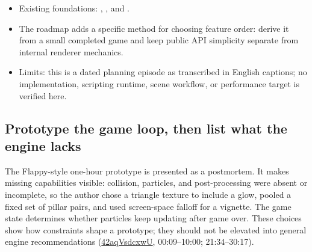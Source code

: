 \hypertarget{05-engine-i-ch013-source-to-volume-map}{}

\begin{itemize}
\tightlist
\item
  Existing foundations: , , and .
\item
  The roadmap adds a specific method for choosing feature order: derive it from a small completed game and keep public API simplicity separate from internal renderer mechanics.
\item
  Limits: this is a dated planning episode as transcribed in English captions; no implementation, scripting runtime, scene workflow, or performance target is verified here.
\end{itemize}

\subsection{Prototype the game loop, then list what the engine lacks}\label{05-engine-i-ch013-prototype-the-game-loop-then-list-what-the-engine-lacks}

\hypertarget{05-engine-i-ch013-prototype-the-game-loop-then-list-what-the-engine-lacks}{}

The Flappy-style one-hour prototype is presented as a postmortem. It makes missing capabilities visible: collision, particles, and post-processing were absent or incomplete, so the author chose a triangle texture to include a glow, pooled a fixed set of pillar pairs, and used screen-space falloff for a vignette. The game state determines whether particles keep updating after game over. These choices show how constraints shape a prototype; they should not be elevated into general engine recommendations (\href{https://www.youtube.com/watch?v=42aqVsdcxwU}{42aqVsdcxwU}, 00:09--10:00; 21:34--30:17).

